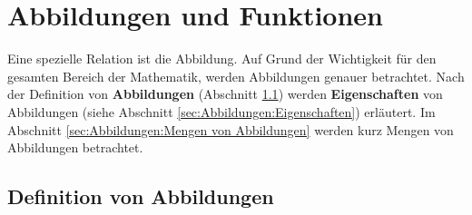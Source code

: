 
\chapter{Abbildungen und Funktionen}
\label{cha:Gdl-K06-Abbildungen}

Eine spezielle Relation ist die Abbildung. Auf Grund der Wichtigkeit für den 
gesamten Bereich der Mathematik, werden Abbildungen genauer betrachtet. Nach 
der Definition von \textbf{Abbildungen} (Abschnitt 
\ref{sec:Abbildungen:Definition}) werden \textbf{Eigenschaften} von
Abbildungen (siehe Abschnitt \ref{sec:Abbildungen:Eigenschaften}) erläutert. 
Im Abschnitt \ref{sec:Abbildungen:Mengen von Abbildungen} werden kurz Mengen 
von Abbildungen betrachtet.

\section{Definition von Abbildungen}
\label{sec:Abbildungen:Definition}

